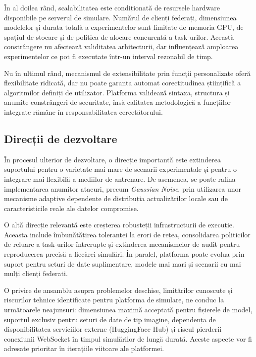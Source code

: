 \documentclass[../../main.tex]{subfiles}
\begin{document}
    În al doilea rând, scalabilitatea este condiționată de resursele hardware disponibile pe serverul de simulare. Numărul de clienți federați, dimensiunea modelelor și durata totală a experimentelor sunt limitate de memoria GPU, de spațiul de stocare și de politica de alocare concurentă a task-urilor. Această constrângere nu afectează validitatea arhitecturii, dar influențează amploarea experimentelor ce pot fi executate într-un interval rezonabil de timp.

    Nu în ultimul rând, mecanismul de extensibilitate prin funcții personalizate oferă flexibilitate ridicată, dar nu poate garanta automat corectitudinea științifică a algoritmilor definiți de utilizator. Platforma validează sintaxa, structura și anumite constrângeri de securitate, însă calitatea metodologică a funcțiilor integrate rămâne în responsabilitatea cercetătorului.

    \newpage
    \subsection{Direcții de dezvoltare}

    În procesul ulterior de dezvoltare, o direcție importantă este extinderea suportului pentru o varietate mai mare de scenarii experimentale și pentru o integrare mai flexibilă a mediilor de antrenare. De asemenea, se poate rafina implementarea anumitor atacuri, precum \textit{Gaussian Noise}, prin utilizarea unor mecanisme adaptive dependente de distribuția actualizărilor locale sau de caracteristicile reale ale datelor compromise.

    O altă direcție relevantă este creșterea robusteții infrastructurii de execuție. Aceasta include îmbunătățirea toleranței la erori de rețea, consolidarea politicilor de reluare a task-urilor întrerupte și extinderea mecanismelor de audit pentru reproducerea precisă a fiecărei simulări. În paralel, platforma poate evolua prin suport pentru seturi de date suplimentare, modele mai mari și scenarii cu mai mulți clienți federati.

    O privire de ansamblu asupra problemelor deschise, limitărilor cunoscute și riscurilor tehnice identificate pentru platforma de simulare, ne conduc la următoarele neajunsuri: dimensiunea maximă acceptată pentru fișierele de model, suportul exclusiv pentru seturi de date de tip imagine, dependența de disponibilitatea serviciilor externe (HuggingFace Hub) și riscul pierderii conexiunii WebSocket în timpul simulărilor de lungă durată. Aceste aspecte vor fi adresate prioritar în iterațiile viitoare ale platformei.
\end{document}
